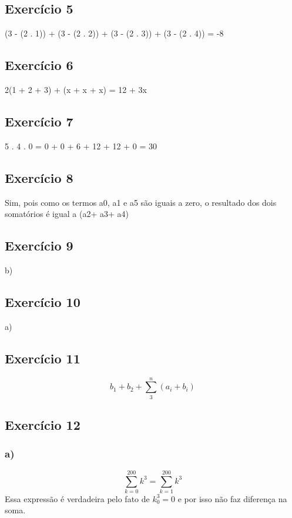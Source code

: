 \documentclass[12pt]{article}
\begin{document}
\subsection{Exercício 5}
\begingroup
\large
    
(3 - (2 . 1)) + (3 - (2 . 2)) + (3 - (2 . 3)) + (3 - (2 . 4)) = -8
\endgroup
\subsection{Exercício 6}
\begingroup
\large
2(1 + 2 + 3) + (x + x + x) = 12 + 3x
\endgroup
\subsection{Exercício 7}
\begingroup
\large
    
5 . 4 . 0 = 0 + 0 + 6 + 12 + 12 + 0 = 30
\endgroup
\subsection{Exercício 8}
Sim, pois como os termos a0, a1 e a5 são iguais a zero, o resultado dos dois somatórios é igual a (a2+ a3+ a4)
\subsection{Exercício 9}
\begingroup
\large  
b)
\endgroup
\subsection{Exercício 10}
\begingroup
\large  
a)
\endgroup
\subsection{Exercício 11}
\begingroup
\LARGE    
\begin{equation}
    b_1 + b_2 + \sum_{3}^{n}(a_i + b_i)
\end{equation}
\endgroup
\subsection{Exercício 12}
\subsubsection{a)}
\begingroup
\LARGE    
\begin{equation}
    \sum_{k=0}^{200}k^3 = \sum_{k=1}^{200}k^3
\end{equation}
\endgroup
Essa expressão é verdadeira pelo fato de $k_0^3 = 0$ e por isso não faz diferença
na soma.
\end{document}
